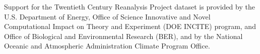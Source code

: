 \documentclass[draft,linenumbers]{agujournal2019}
\begin{document}
\acknowledgments
Support for the Twentieth Century Reanalysis Project dataset is provided by the U.S. Department of Energy, Office of Science Innovative and Novel Computational Impact on Theory and Experiment (DOE INCITE) program, and Office of Biological and Environmental Research (BER), and by the National Oceanic and Atmospheric Administration Climate Program Office.



%
% 
%








\end{document}
